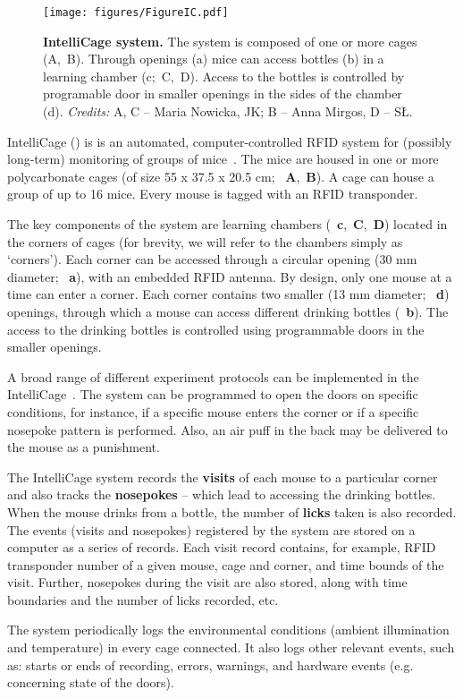 
\begin{figure*}
  \texttt{[image: figures/FigureIC.pdf]}
  \caption{
    {\bf IntelliCage system.} 
    The system is composed of one or more cages (A,~B).
    Through openings (a) mice can access bottles (b) in a learning chamber (c;~C,~D).
    Access to the bottles is controlled by programable door in smaller openings in the sides
    of the chamber (d). \emph{Credits:} A, C -- Maria Nowicka, JK; B -- Anna Mirgos, D -- SŁ.
  }
  \label{intellicageSystem}
\end{figure*}

IntelliCage () is is an automated, computer-controlled RFID system for
(possibly long-term) monitoring of groups of
mice~\cite{Galsworthy:2005br,Krackow:2010ck,Puscian:2014cu}. The mice are housed in 
one or more polycarbonate cages (of size 55 x 37.5 x 20.5 cm;
~\textbf{A},~\textbf{B}). A cage can house a group of up to
16 mice. Every mouse is tagged with an RFID transponder.

The key components of the system are learning chambers
(~\textbf{c},~\textbf{C},~\textbf{D}) 
located in the corners of cages
(for brevity, we will refer to the chambers simply as `corners'). Each
corner can be accessed through a circular opening (30 mm diameter; ~\textbf{a}),
with an embedded RFID antenna. By design, only one mouse at a time can enter
a corner. Each corner contains two smaller (13 mm diameter; ~\textbf{d}) openings,
through which a mouse can access different drinking bottles (~\textbf{b}). The access to the
drinking bottles is controlled using programmable doors in
the smaller openings.


A broad range of different experiment protocols can be implemented in the
IntelliCage~\cite{Knapska:2006cz,Kiryk:2011tk,Endo:2011bs,Radwanska:2012fd,Knapska:2013dj,Smutek:2014da,Puscian:2014cu,Vannoni:2014jt}.
The system can be programmed to open the doors on specific conditions, for
instance, if a specific mouse enters the corner or if a specific nosepoke
pattern is performed. Also, an air puff in the back may be delivered to the
mouse as a punishment.

The IntelliCage system records the \textbf{visits} of
each mouse to a particular corner and also tracks the \textbf{nosepokes}
-- which lead to accessing the drinking bottles. When the mouse drinks
from a bottle, the number of \textbf{licks} taken is also recorded.
The events (visits and nosepokes) registered by the system are stored on a
computer as a series of records. Each visit record contains, for example,
RFID transponder number of a given mouse, cage and corner,
and time bounds of the visit. Further,
nosepokes during the visit are also stored, along with
time boundaries and the number of licks recorded, etc.

The system periodically logs the environmental conditions (ambient
illumination and temperature) in every cage connected. It also logs other
relevant events, such as: starts or ends of recording, errors, warnings, and
hardware events (e.g. concerning state of the doors).
